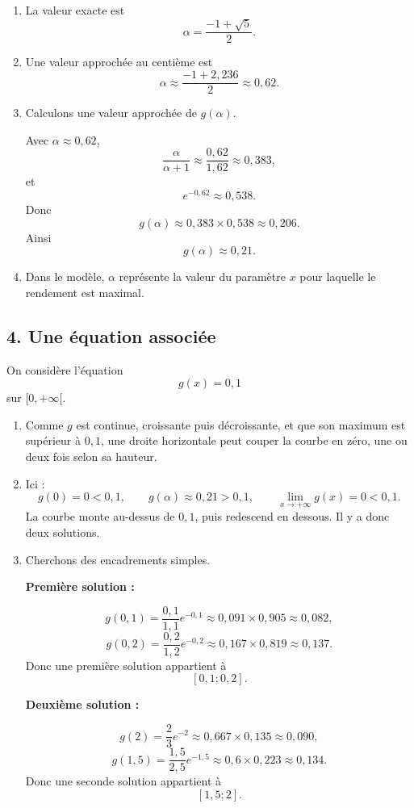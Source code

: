 \documentclass[11pt,a4paper]{article}
\begin{document}
\begin{enumerate}
    \item La valeur exacte est
    \[
    \alpha=\frac{-1+\sqrt{5}}{2}.
    \]

    \item Une valeur approchée au centième est
    \[
    \alpha\approx \frac{-1+2{,}236}{2}\approx 0{,}62.
    \]

    \item Calculons une valeur approchée de \(g(\alpha)\).

    Avec \(\alpha\approx 0{,}62\),
    \[
    \frac{\alpha}{\alpha+1}\approx \frac{0{,}62}{1{,}62}\approx 0{,}383,
    \]
    et
    \[
    e^{-0{,}62}\approx 0{,}538.
    \]
    Donc
    \[
    g(\alpha)\approx 0{,}383\times 0{,}538\approx 0{,}206.
    \]
    Ainsi
    \[
    g(\alpha)\approx 0{,}21.
    \]

    \item Dans le modèle, \(\alpha\) représente la valeur du paramètre \(x\) pour laquelle le rendement est maximal.
\end{enumerate}

\subsection*{4. Une équation associée}

On considère l'équation
\[
g(x)=0{,}1
\]
sur \([0,+\infty[\).

\begin{enumerate}
    \item Comme \(g\) est continue, croissante puis décroissante, et que son maximum est supérieur à \(0{,}1\), une droite horizontale peut couper la courbe en zéro, une ou deux fois selon sa hauteur.

    \item Ici :
    \[
    g(0)=0<0{,}1, \qquad g(\alpha)\approx 0{,}21>0{,}1, \qquad \lim_{x\to+\infty}g(x)=0<0{,}1.
    \]
    La courbe monte au-dessus de \(0{,}1\), puis redescend en dessous. Il y a donc deux solutions.

    \item Cherchons des encadrements simples.

    \textbf{Première solution :}

    \[
    g(0{,}1)=\frac{0{,}1}{1{,}1}e^{-0{,}1}\approx 0{,}091\times 0{,}905\approx 0{,}082,
    \]
    \[
    g(0{,}2)=\frac{0{,}2}{1{,}2}e^{-0{,}2}\approx 0{,}167\times 0{,}819\approx 0{,}137.
    \]
    Donc une première solution appartient à
    \[
    [0{,}1;0{,}2].
    \]

    \textbf{Deuxième solution :}

    \[
    g(2)=\frac{2}{3}e^{-2}\approx 0{,}667\times 0{,}135\approx 0{,}090,
    \]
    \[
    g(1{,}5)=\frac{1{,}5}{2{,}5}e^{-1{,}5}\approx 0{,}6\times 0{,}223\approx 0{,}134.
    \]
    Donc une seconde solution appartient à
    \[
    [1{,}5;2].
    \]
\end{enumerate}
\end{document}
